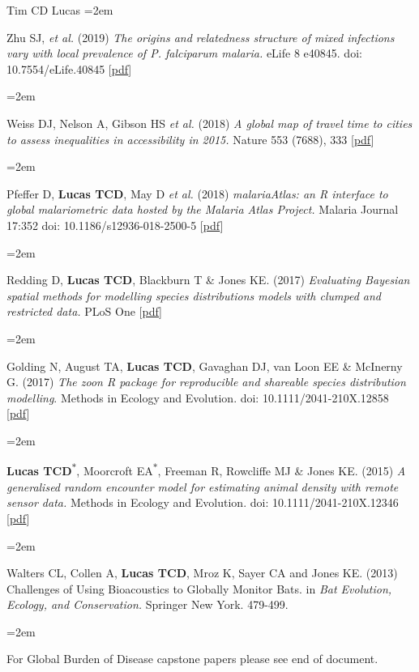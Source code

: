 \documentclass{scrartcl}
\newcommand{\MarginText}[1]{\marginpar{\raggedleft\itshape\small#1}} %
\newcommand{\Description}[1]{\hangindent=2em\hangafter=0\noindent\raggedright\footnotesize{#1}\par\normalsize\vspace{1em}} %
\begin{document}
\begin{cv}{Tim {\Large CD} Lucas}
\Description{Zhu SJ, \emph{et al.} (2019) \emph{The origins and relatedness structure of mixed infections vary with local prevalence of \emph{P. falciparum} malaria.} eLife 8 e40845. doi: 10.7554/eLife.40845 [\href{https://doi.org/10.7554/eLife.40845}{pdf}]}




\Description{\MarginText{2018}Weiss DJ, Nelson A, Gibson HS \emph{et al.} (2018) \emph{A global map of travel time to cities to assess inequalities in accessibility in 2015.} Nature 553 (7688), 333 [\href{https://www.nature.com/articles/nature25181.pdf}{pdf}]}

\Description{Pfeffer D, \textbf{Lucas TCD}, May D \emph{et al.} (2018) \emph{malariaAtlas: an R interface to global malariometric data hosted by the Malaria Atlas Project.} Malaria Journal 17:352 doi: 10.1186/s12936-018-2500-5 [\href{https://malariajournal.biomedcentral.com/track/pdf/10.1186/s12936-018-2500-5}{pdf}]}


\Description{\MarginText{2017}Redding D, \textbf{Lucas TCD}, Blackburn T \& Jones KE. (2017) \emph{Evaluating Bayesian spatial methods for modelling species distributions models with clumped and restricted data.} PLoS One [\href{https://journals.plos.org/plosone/article/file?id=10.1371/journal.pone.0187602&type=printable}{pdf}]}

\Description{Golding N, August TA, \textbf{Lucas TCD}, Gavaghan DJ, van Loon EE \& McInerny G. (2017) \emph{The zoon R package for reproducible and shareable species distribution modelling}. Methods in Ecology and Evolution. doi: 10.1111/2041-210X.12858 [\href{http://onlinelibrary.wiley.com/doi/10.1111/2041-210X.12858/pdf}{pdf}]}

\Description{\MarginText{2015}\textbf{Lucas TCD}\textsuperscript{$\ast$}, Moorcroft EA\textsuperscript{$\ast$}, Freeman R, Rowcliffe MJ \& Jones KE. (2015) \emph{A generalised random encounter model for estimating animal density with remote sensor data.} Methods in Ecology and Evolution. doi: 10.1111/2041-210X.12346 [\href{http://onlinelibrary.wiley.com/doi/10.1111/2041-210X.12346/epdf}{pdf}]}

\Description{\MarginText{2013}Walters CL, Collen A, \textbf{Lucas TCD}, Mroz K, Sayer CA and Jones KE. (2013) Challenges of Using Bioacoustics to Globally Monitor Bats. in \emph{Bat Evolution, Ecology, and Conservation.} Springer New York. 479-499.}

\Description{\MarginText{GBD}For Global Burden of Disease capstone papers please see end of document.}


\end{cv}
\end{document}
